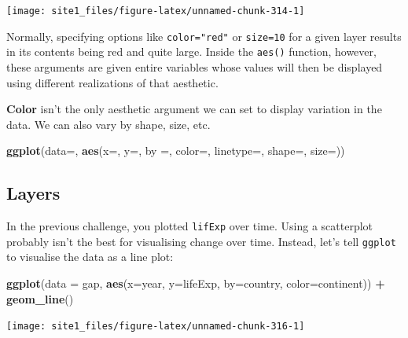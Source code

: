 \documentclass[]{book}
\newenvironment{Shaded}{\begin{snugshade}}{\end{snugshade}}
\newcommand{\KeywordTok}[1]{\textcolor[rgb]{0.13,0.29,0.53}{\textbf{#1}}}
\newcommand{\DataTypeTok}[1]{\textcolor[rgb]{0.13,0.29,0.53}{#1}}
\newcommand{\StringTok}[1]{\textcolor[rgb]{0.31,0.60,0.02}{#1}}
\newcommand{\OperatorTok}[1]{\textcolor[rgb]{0.81,0.36,0.00}{\textbf{#1}}}
\newcommand{\NormalTok}[1]{#1}
\begin{document}
\begin{center}\texttt{[image: site1\_files/figure-latex/unnamed-chunk-314-1]} \end{center}

Normally, specifying options like \texttt{color="red"} or
\texttt{size=10} for a given layer results in its contents being red and
quite large. Inside the \texttt{aes()} function, however, these
arguments are given entire variables whose values will then be displayed
using different realizations of that aesthetic.

\textbf{Color} isn't the only aesthetic argument we can set to display
variation in the data. We can also vary by shape, size, etc.

\begin{Shaded}
\begin{Highlighting}[]
\KeywordTok{ggplot}\NormalTok{(}\DataTypeTok{data=}\NormalTok{, }\KeywordTok{aes}\NormalTok{(}\DataTypeTok{x=}\NormalTok{, }\DataTypeTok{y=}\NormalTok{, }\DataTypeTok{by =}\NormalTok{, }\DataTypeTok{color=}\NormalTok{, }\DataTypeTok{linetype=}\NormalTok{, }\DataTypeTok{shape=}\NormalTok{, }\DataTypeTok{size=}\NormalTok{))}
\end{Highlighting}
\end{Shaded}

\subsection{Layers}\label{layers}

In the previous challenge, you plotted \texttt{lifExp} over time. Using
a scatterplot probably isn't the best for visualising change over time.
Instead, let's tell \texttt{ggplot} to visualise the data as a line
plot:

\begin{Shaded}
\begin{Highlighting}[]
\KeywordTok{ggplot}\NormalTok{(}\DataTypeTok{data =}\NormalTok{ gap, }\KeywordTok{aes}\NormalTok{(}\DataTypeTok{x=}\NormalTok{year, }\DataTypeTok{y=}\NormalTok{lifeExp, }\DataTypeTok{by=}\NormalTok{country, }\DataTypeTok{color=}\NormalTok{continent)) }\OperatorTok{+}\StringTok{ }
\StringTok{  }\KeywordTok{geom_line}\NormalTok{()}
\end{Highlighting}
\end{Shaded}

\begin{center}\texttt{[image: site1\_files/figure-latex/unnamed-chunk-316-1]} \end{center}
\end{document}
